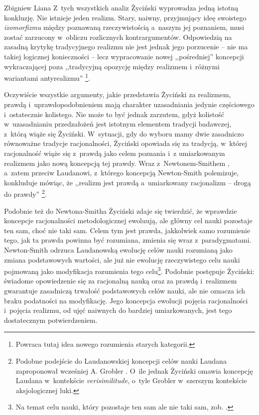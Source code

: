 \begin{artplenv}{Zbigniew Liana}
Z~tych wszystkich analiz Życiński wyprowadza jedną istotną konkluzję. Nie istnieje jeden realizm. Stary, naiwny, przyjmujący ideę swoistego \textit{izomorfizmu} między poznawaną rzeczywistością a~naszym jej poznaniem, musi zostać zarzucony w~obliczu rozlicznych kontrargumentów. Odpowiedzią na zasadną krytykę tradycyjnego realizmu nie jest jednak jego porzucenie -- nie ma takiej logicznej konieczności -- lecz wypracowanie nowej ,,pośredniej'' koncepcji wykraczającej poza ,,tradycyjną opozycję między realizmem i~różnymi wariantami antyrealizmu''
\parencite[][s.~184]{zycinski_teizm_1985}%
\footnote{Powraca tutaj idea nowego rozumienia starych kategorii.}.

Oczywiście wszystkie argumenty, jakie przedstawia Życiński za realizmem, prawdą i~uprawdopodobnieniem mają charakter uzasadniania jedynie częściowego i~ostatecznie kolistego. Nie może to być jednak zarzutem, gdyż kolistość w~uzasadnianiu przedzałożeń jest istotnym elementem tradycji badawczej, z~którą wiąże się Życiński. W~sytuacji, gdy do wyboru mamy dwie zasadniczo równoważne tradycje racjonalności, Życiński opowiada się za tradycją, w~której racjonalność wiąże się z~prawdą jako celem poznania i~z umiarkowanym realizmem jako nową koncepcją tej prawdy. Wraz z~Newtonem-Smithem
\parencite[][s.~273]{newton-smith_rationality_1981}, %
 a~zatem przeciw Laudanowi, z~którego koncepcją Newton-Smith polemizuje, konkluduje mówiąc, że ,,realizm jest prawdą a~umiarkowany racjonalizm -- drogą do prawdy'' 
\parencites[][s.~205]{zycinski_teizm_1985}[][s.~135]{zycinski_structure_1988}[][s.~239]{zycinski_struktura_2013_liana}%
\footnote{Podobne podejście do Laudanowskiej koncepcji celów nauki Laudana zaproponował wcześniej A. Grobler 
\parencite*[][s.~23.35-42]{grobler_prawda_1993}. %
 O~ile jednak Życiński omawia koncepcję Laudana w~kontekście \textit{verisimilitude}, o~tyle Grobler w~szerszym kontekście aksjologicznej luki.}.

Podobnie też do Newtona-Smitha Życiński zdaje się twierdzić, że wprawdzie koncepcje racjonalności metodologicznej ewoluują, ale główny cel nauki pozostaje ten sam, choć nie taki sam. Celem tym jest prawda, jakkolwiek samo rozumienie tego, jak ta prawda powinna być rozumiana, zmienia się wraz z~paradygmatami. Newton-Smith odrzuca Laudanowską ewolucję celów nauki rozumianą jako zmiana podstawowych wartości, ale już nie ewolucję rzeczywistego celu nauki pojmowaną jako modyfikacja rozumienia tego celu\footnote{Na temat celu nauki, który pozostaje ten sam ale nie taki sam, zob.
\parencite[][s.~221nn.269n]{newton-smith_rationality_1981}.%
}. Podobnie postępuje Życiński: świadome opowiedzenie się za racjonalną nauką oraz za prawdą i~realizmem gwarantuje zasadniczą trwałość podstawowych celów nauki, ale nie oznacza ich braku podatności na modyfikację. Jego koncepcja ewolucji pojęcia racjonalności i~pojęcia realizmu, od ujęć naiwnych do bardziej umiarkowanych, jest tego dostatecznym potwierdzeniem.


\end{artplenv}
